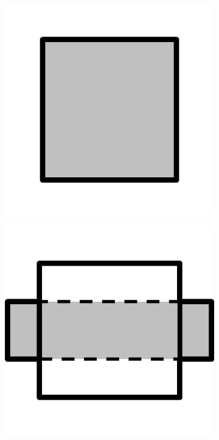 \documentclass{article}
\begin{document}
\begin{figure}[!h]
\begin{subfigure}{.25\textwidth}
    \caption{}
    \label{fig:c12}
  \end{subfigure}\\
  \begin{subfigure}{.25\textwidth}
    \centering
    \includegraphics[width=.95\linewidth]{16cases/c13.png}
    \caption{}
    \label{fig:c13}
  \end{subfigure}%
  \begin{subfigure}{.25\textwidth}
    \centering
    \includegraphics[width=.95\linewidth]{16cases/c14.png}

\end{subfigure}
\end{figure}
\end{document}
